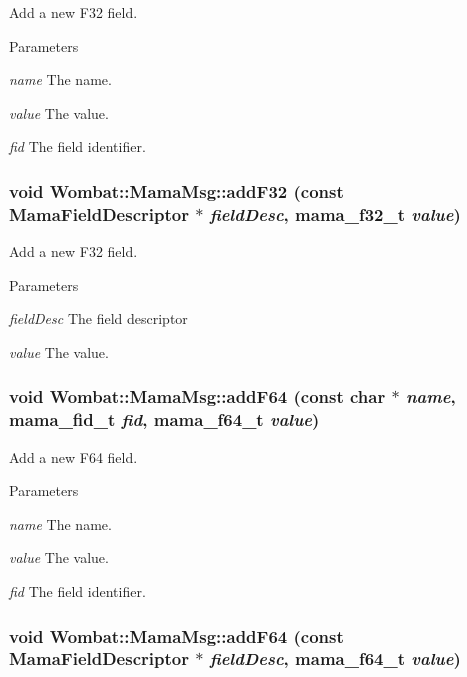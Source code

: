 Add a new F32 field. 
\begin{DoxyParams}{Parameters}
\item[{\em name}]The name. \item[{\em value}]The value. \item[{\em fid}]The field identifier. \end{DoxyParams}
\hypertarget{classWombat_1_1MamaMsg_a7402072db17e11f62c64e29288c60bfc}{
\subsubsection[{addF32}]{\setlength{\rightskip}{0pt plus 5cm}void Wombat::MamaMsg::addF32 (const {\bf MamaFieldDescriptor} $\ast$ {\em fieldDesc}, \/  mama\_\-f32\_\-t {\em value})}}
\label{classWombat_1_1MamaMsg_a7402072db17e11f62c64e29288c60bfc}


Add a new F32 field. 
\begin{DoxyParams}{Parameters}
\item[{\em fieldDesc}]The field descriptor \item[{\em value}]The value. \end{DoxyParams}
\hypertarget{classWombat_1_1MamaMsg_a680382f149b56dcc79650560b8150437}{
\subsubsection[{addF64}]{\setlength{\rightskip}{0pt plus 5cm}void Wombat::MamaMsg::addF64 (const char $\ast$ {\em name}, \/  mama\_\-fid\_\-t {\em fid}, \/  mama\_\-f64\_\-t {\em value})}}
\label{classWombat_1_1MamaMsg_a680382f149b56dcc79650560b8150437}


Add a new F64 field. 
\begin{DoxyParams}{Parameters}
\item[{\em name}]The name. \item[{\em value}]The value. \item[{\em fid}]The field identifier. \end{DoxyParams}
\hypertarget{classWombat_1_1MamaMsg_a8f4fc60f122c70af8a0dccc3c2d6a959}{
\subsubsection[{addF64}]{\setlength{\rightskip}{0pt plus 5cm}void Wombat::MamaMsg::addF64 (const {\bf MamaFieldDescriptor} $\ast$ {\em fieldDesc}, \/  mama\_\-f64\_\-t {\em value})}}
\label{classWombat_1_1MamaMsg_a8f4fc60f122c70af8a0dccc3c2d6a959}


